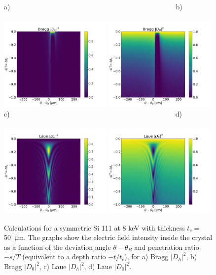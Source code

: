 \documentclass[preprint]{iucr}              %
\begin{document}
\begin{figure}\label{fig:braggMap}
    \centering
    a)~~~~~~~~~~~~~~~~~~~~~~~~~~~~~~~~~~~~~~~~~~~~~~~~b)~~~~~~~~~~~~~~~~~~~~~~~~~~~~~~~~~~~~~~~~~~\\
    \includegraphics[width=0.49\textwidth]{figures/Bragg_DH.png}
    \includegraphics[width=0.49\textwidth]{figures/Bragg_D0.png}
    c)~~~~~~~~~~~~~~~~~~~~~~~~~~~~~~~~~~~~~~~~~~~~~~~~d)~~~~~~~~~~~~~~~~~~~~~~~~~~~~~~~~~~~~~~~~~\\
    \includegraphics[width=0.49\textwidth]{figures/Laue_DH.png}
    \includegraphics[width=0.49\textwidth]{figures/Laue_D0.png}
    \caption{Calculations for a symmetric Si 111 at 8 keV with thickness $t_c=$\SI{50}{\micro\meter}. The graphs show the electric field intensity inside the crystal as a function of the 
    deviation angle $\theta-\theta_B$ and penetration ratio $-s/T$ (equivalent to a depth ratio $-t/t_c$), for
    a) Bragg $|D_h|^2$, b) Bragg $|D_0|^2$,
    c) Laue $|D_h|^2$, d) Laue $|D_0|^2$.
    }
\end{figure}
\end{document}
